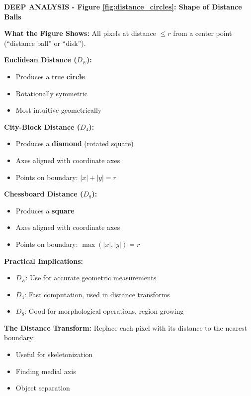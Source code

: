 \documentclass[12pt,a4paper]{article}
\begin{document}
\begin{deepexplanation}
\textbf{DEEP ANALYSIS - Figure \ref{fig:distance_circles}: Shape of Distance Balls}

\textbf{What the Figure Shows:}
All pixels at distance $\leq r$ from a center point (``distance ball'' or ``disk'').

\textbf{Euclidean Distance ($D_E$):}
\begin{itemize}
    \item Produces a true \textbf{circle}
    \item Rotationally symmetric
    \item Most intuitive geometrically
\end{itemize}

\textbf{City-Block Distance ($D_4$):}
\begin{itemize}
    \item Produces a \textbf{diamond} (rotated square)
    \item Axes aligned with coordinate axes
    \item Points on boundary: $|x| + |y| = r$
\end{itemize}

\textbf{Chessboard Distance ($D_8$):}
\begin{itemize}
    \item Produces a \textbf{square}
    \item Axes aligned with coordinate axes
    \item Points on boundary: $\max(|x|, |y|) = r$
\end{itemize}

\textbf{Practical Implications:}
\begin{itemize}
    \item $D_E$: Use for accurate geometric measurements
    \item $D_4$: Fast computation, used in distance transforms
    \item $D_8$: Good for morphological operations, region growing
\end{itemize}

\textbf{The Distance Transform:}
Replace each pixel with its distance to the nearest boundary:
\begin{itemize}
    \item Useful for skeletonization
    \item Finding medial axis
    \item Object separation
\end{itemize}
\end{deepexplanation}
\end{document}
